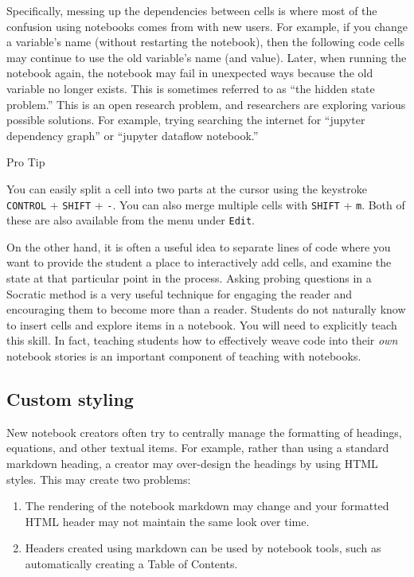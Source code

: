 \documentclass[]{book}
\let\BeginKnitrBlock\begin \let\EndKnitrBlock\end
\begin{document}
Specifically, messing up the dependencies between cells is where most of
the confusion using notebooks comes from with new users. For example, if
you change a variable's name (without restarting the notebook), then the
following code cells may continue to use the old variable's name (and
value). Later, when running the notebook again, the notebook may fail in
unexpected ways because the old variable no longer exists. This is
sometimes referred to as ``the hidden state problem.'' This is an open
research problem, and researchers are exploring various possible
solutions. For example, trying searching the internet for ``jupyter
dependency graph'' or ``jupyter dataflow notebook.''

\BeginKnitrBlock{rmdnote}
Pro Tip

You can easily split a cell into two parts at the cursor using the
keystroke \texttt{CONTROL} + \texttt{SHIFT} + \texttt{-}. You can also
merge multiple cells with \texttt{SHIFT} + \texttt{m}. Both of these are
also available from the menu under \texttt{Edit}.
\EndKnitrBlock{rmdnote}

On the other hand, it is often a useful idea to separate lines of code
where you want to provide the student a place to interactively add
cells, and examine the state at that particular point in the process.
Asking probing questions in a Socratic method is a very useful technique
for engaging the reader and encouraging them to become more than a
reader. Students do not naturally know to insert cells and explore items
in a notebook. You will need to explicitly teach this skill. In fact,
teaching students how to effectively weave code into their \emph{own}
notebook stories is an important component of teaching with notebooks.

\subsection{Custom styling}\label{custom-styling}

New notebook creators often try to centrally manage the formatting of
headings, equations, and other textual items. For example, rather than
using a standard markdown heading, a creator may over-design the
headings by using HTML styles. This may create two problems:

\begin{enumerate}
\def\labelenumi{\arabic{enumi}.}
\item
  The rendering of the notebook markdown may change and your formatted
  HTML header may not maintain the same look over time.
\item
  Headers created using markdown can be used by notebook tools, such as
  automatically creating a Table of Contents.
\end{enumerate}
\end{document}
